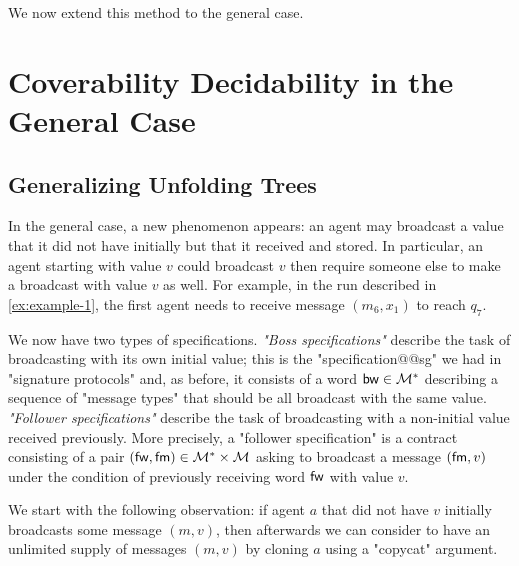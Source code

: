 We now extend this method to the general case. 


\section{Coverability Decidability in the General Case}
\label{subsec:cover-general-case}

\subsection{Generalizing Unfolding Trees}
\label{sec:unfolding-trees-general}
In the general case, a new phenomenon appears: an agent may broadcast a value that it did not have initially but that it received and stored. In particular, an agent starting with value $v$ could broadcast $v$ then require someone else to make a broadcast with value $v$ as well. For example, in the run described in \cref{ex:example-1}, the first agent needs to receive message $(m_6, x_1)$ to reach $q_7$.

 We now have two types of specifications. \emph{"Boss specifications"} describe the task of broadcasting with its own initial value; this is the "specification@@sg" we had in "signature protocols" and, as before, it consists of a word $\mathsf{bw} \in \mathcal{M}^\ast$ describing a sequence of "message types" that should be all broadcast with the same value. \emph{"Follower specifications"} describe the task of broadcasting with a non-initial value received previously. More precisely, a "follower specification" is a contract consisting of a pair $(\mathsf{fw}, \mathsf{fm}) \in \mathcal{M}^*\times \mathcal{M}$ asking to broadcast a message $(\mathsf{fm},v)$ under the condition of previously receiving word $\mathsf{fw}$ with value $v$.


We start with the following observation: if agent $a$ that did not have $v$ initially broadcasts some message $(m,v)$, then afterwards we can consider to have an unlimited supply of messages $(m,v)$ by cloning $a$ using a "copycat" argument. 

